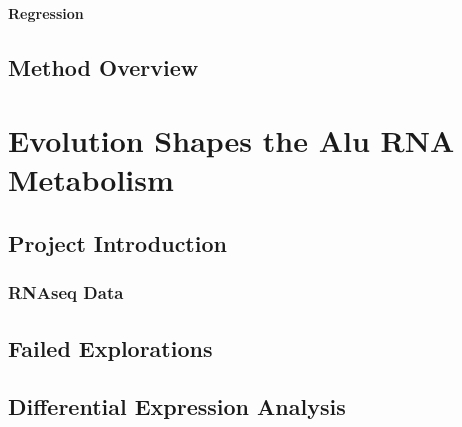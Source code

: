\subsubsection{Regression}

\section{Method Overview}








































\chapter{Evolution Shapes the Alu RNA Metabolism}

\section{Project Introduction}

\subsection{RNAseq Data}

\section{Failed Explorations}

\section{Differential Expression Analysis}

